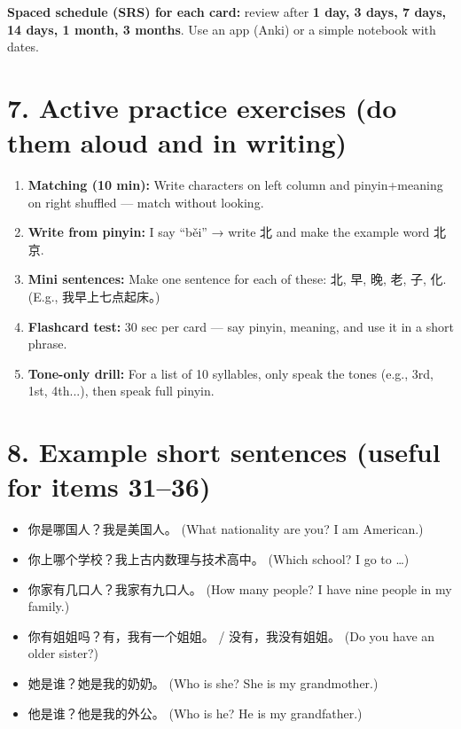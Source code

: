 \begin{CJK}{UTF8}{gbsn}
\textbf{Spaced schedule (SRS) for each card:} review after \textbf{1 day, 3 days, 7 days, 14 days, 1 month, 3 months}.  
Use an app (Anki) or a simple notebook with dates.

\section*{7. Active practice exercises (do them aloud and in writing)}
\begin{enumerate}
  \item \textbf{Matching (10 min):} Write characters on left column and pinyin+meaning on right shuffled — match without looking.
  \item \textbf{Write from pinyin:} I say ``běi'' → write 北 and make the example word 北京.
  \item \textbf{Mini sentences:} Make one sentence for each of these: 北, 早, 晚, 老, 子, 化. (E.g., 我早上七点起床。)
  \item \textbf{Flashcard test:} 30 sec per card — say pinyin, meaning, and use it in a short phrase.
  \item \textbf{Tone-only drill:} For a list of 10 syllables, only speak the tones (e.g., 3rd, 1st, 4th...), then speak full pinyin.
\end{enumerate}

\section*{8. Example short sentences (useful for items 31--36)}
\begin{itemize}
  \item 你是哪国人？\quad 我是美国人。 (What nationality are you? I am American.)
  \item 你上哪个学校？\quad 我上古内数理与技术高中。 (Which school? I go to \dots)
  \item 你家有几口人？\quad 我家有九口人。 (How many people? I have nine people in my family.)
  \item 你有姐姐吗？\quad 有，我有一个姐姐。 / 没有，我没有姐姐。 (Do you have an older sister?)
  \item 她是谁？\quad 她是我的奶奶。 (Who is she? She is my grandmother.)
  \item 他是谁？\quad 他是我的外公。 (Who is he? He is my grandfather.)
\end{itemize}


\end{CJK}
